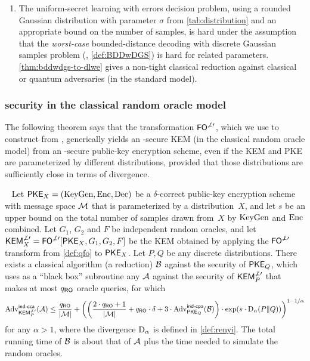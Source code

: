 \documentclass{iacrcc}
\begin{document}
\begin{enumerate}
\item The uniform-secret learning with errors decision problem, using
  a rounded Gaussian distribution with parameter $\sigma$ from
  \autoref{tab:distribution} and an appropriate bound on the number of
  samples, is hard under the assumption that the \emph{worst-case}
  bounded-distance decoding with discrete Gaussian samples problem
  (\BDDwDGS, \autoref{def:BDDwDGS}) is hard for related parameters.
  \autoref{thm:bddwdgs-to-dlwe} gives a non-tight classical reduction
  against classical or quantum adversaries (in the standard model).
\end{enumerate}

\subsubsection{\INDCCA security in the classical random oracle model}\label{sec:strength:cca-kem} \label{sec:renyi_loss}

The following theorem says that the transformation $\textsf{\upshape\mdseries FO}^{\not\perp\prime}$,
which we use to construct \FrodoKEM from \FrodoPKE, generically yields
an \INDCCA-secure KEM (in the classical random oracle model) from an
\INDCPA-secure public-key encryption scheme, even if the KEM and PKE
are parameterized by different distributions, provided that those
distributions are sufficiently close in terms of \renyi divergence.

\begin{theorem}\label{thm:cca-kem-to-cpa-pke-rom-parameterized}
  \ \newline
  Let $\textsf{\upshape\mdseries PKE}_X = (\textrm{\upshape\mdseries KeyGen},\textrm{\upshape\mdseries Enc},\textrm{\upshape\mdseries Dec})$ be a $\delta$-correct public-key
  encryption scheme with message space $\mathcal{M}$ that is parameterized
  by a distribution~$X$, and let $s$ be an upper bound on the total
  number of samples drawn from~$X$ by $\textrm{\upshape\mdseries KeyGen}$ and $\textrm{\upshape\mdseries Enc}$ combined.
  Let $G_1$, $G_2$ and $F$ be independent random oracles, and let
  $\textsf{\upshape\mdseries KEM}^{\not\perp\prime}_X=\textsf{\upshape\mdseries FO}^{\not\perp\prime}[\textsf{\upshape\mdseries PKE}_X,G_1,G_2,F]$ be the KEM
  obtained by applying the $\textsf{\upshape\mdseries FO}^{\not\perp\prime}$ transform from
  \autoref{def:qfo} to $\textsf{\upshape\mdseries PKE}_{X}$. Let $P,Q$ be any discrete
  distributions. There exists a classical algorithm (a reduction)
  $\mathcal{B}$ against the \INDCPA security of $\textsf{\upshape\mdseries PKE}_Q$, which uses as
  a ``black box'' subroutine any $\mathcal{A}$ against the \INDCCA
  security of $\textsf{\upshape\mdseries KEM}^{\not\perp\prime}_P$ that makes at most $q_{\mathsf{RO}}$ oracle
  queries, for which
  \begin{equation}
    \label{eq:cca-to-cpa-renyi-bound}
    \mathrm{Adv}^{\textsf{\upshape\mdseries \textsf{\upshape\mdseries ind-cca}}}_{\textsf{\upshape\mdseries KEM}^{\not\perp\prime}_P}(\mathcal{A}) \leq
    \frac{q_{\mathsf{RO}}}{|\mathcal{M}|} + \left( \left(
        \frac{2\cdot q_{\mathsf{RO}}+1}{|\mathcal{M}|}
        + q_{\mathsf{RO}} \cdot \delta
        + 3 \cdot\mathrm{Adv}^{\textsf{\upshape\mdseries \textsf{\upshape\mdseries ind-cpa}}}_{\textsf{\upshape\mdseries PKE}_Q}(\mathcal{B}) \right)
      \cdot \exp(s \cdot \mathrm{D}_\alpha(P \| Q)) \right)^{1-1/\alpha}
  \end{equation}
  for any $\alpha > 1$, where the \renyi divergence $\mathrm{D}_\alpha$ is
  defined in \autoref{def:renyi}. The total running time of
  $\mathcal{B}$ is about that of $\mathcal{A}$ plus the time needed to
  simulate the random oracles.
\end{theorem}
\end{document}
